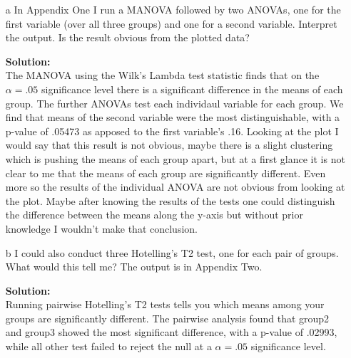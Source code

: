 \documentclass[12pt]{article}
\makeatletter
\theoremstyle{homework}
\newenvironment{exercise}[1]
{\def\@currentlabel{#1}\exercisecore}
{\endexercisecore}
\newcommand{\localhead}[1]{\par\smallskip\noindent\textbf{#1}\nobreak\\}%
\newcommand\solution{\localhead{Solution:}}
\makeatother
\begin{document}
\begin{exercise}{3}
  \begin{enumerate}
    \item[a] In Appendix One I run a MANOVA followed by two ANOVAs, one for the first variable (over all three groups) and one for a second variable. Interpret the output. Is the result obvious from the plotted data?\\
    \solution The MANOVA using the Wilk's Lambda test statistic finds that on the $\alpha = .05$ significance level there is a significant difference in the means of each group. The further ANOVAs test each individaul variable 
    for each group. We find that means of the second variable were the most distinguishable, with a p-value of .05473 as apposed to the first variable's .16. Looking at the plot I would say that this result is not obvious, maybe there is a slight  
     clustering which is pushing the means of each group apart, but at a first glance it is not clear to me that the means of each group are significantly different. Even more so the results of the individual ANOVA are not obvious from looking at the plot. 
     Maybe after knowing the results of the tests one could distinguish the difference between the means along the y-axis but without prior knowledge I wouldn't make that conclusion.    
    \vspace{.15in}
    
    


    \item[b] I could also conduct three Hotelling's T2 test, one for each pair of groups. What would this tell me? The output is in Appendix Two.\\   
    \solution Running pairwise Hotelling's T2 tests tells you which means among your groups are significantly different. The pairwise analysis found that group2 and group3 showed 
    the most significant difference, with a p-value of .02993, while all other test failed to reject the null at a $\alpha = .05$ significance level. 

  \end{enumerate}
\end{exercise}
\vspace{1in}
\end{document}
